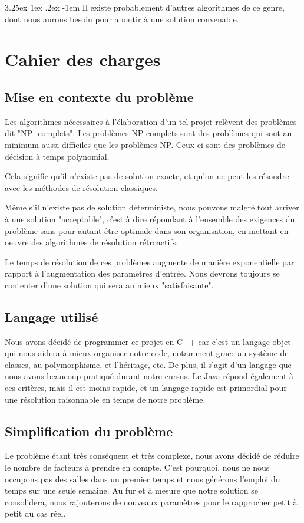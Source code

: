 \documentclass[12pt,a4paper,french]{article}
\makeatletter
\renewcommand\paragraph{\@startsection{paragraph}{5}{\z@}%
  {3.25ex \@plus1ex \@minus.2ex}%
  {-1em}%
  {\normalfont\normalsize\bfseries}}
\makeatother
\begin{document}
\paragraph{}
Il existe probablement d'autres algorithmes de ce genre, dont nous aurons besoin pour aboutir à une solution convenable.

\newpage
\section{Cahier des charges}
\subsection{Mise en contexte du problème}

Les algorithmes nécessaires à l'élaboration d'un tel projet relèvent des problèmes dit "NP- complets". Les problèmes NP-complets sont des problèmes qui sont au minimum aussi difficiles que les problèmes NP. Ceux-ci sont des problèmes de décision à temps polynomial.

Cela signifie qu'il n'existe pas de solution exacte, et qu'on ne peut les résoudre avec les méthodes de résolution classiques.

Même s'il n'existe pas de solution déterministe, nous pouvons malgré tout arriver à une solution "acceptable", c'est à dire répondant à l'ensemble des exigences du problème sans pour autant être optimale dans son organisation, en mettant en oeuvre des algorithmes de résolution rétroactifs.

Le temps de résolution de ces problèmes augmente de manière exponentielle par rapport à l'augmentation des paramètres d'entrée. Nous devrons toujours se contenter d'une solution qui sera au mieux "satisfaisante".
\cite{01-npComplet}

\subsection{Langage utilisé}
Nous avons décidé de programmer ce projet en C++ car c'est un langage objet qui nous aidera à mieux organiser notre code, notamment grace au système de classes, au polymorphisme, et l'héritage, etc. De plus, il s'agit d'un langage que nous avons beaucoup pratiqué durant notre cursus.
Le Java répond également à ces critères, mais il est moins rapide, et un langage rapide est primordial pour une résolution raisonnable en temps de notre problème.

\subsection{Simplification du problème}
Le problème étant très conséquent et très complexe, nous avons décidé de réduire le nombre de facteurs à prendre en compte. C'est pourquoi, nous ne nous occupons pas des salles dans un premier temps et nous générons l'emploi du temps sur une seule semaine. Au fur et à mesure que notre solution se consolidera, nous rajouterons de nouveaux paramètres pour le rapprocher petit à petit du cas réel.
\end{document}
